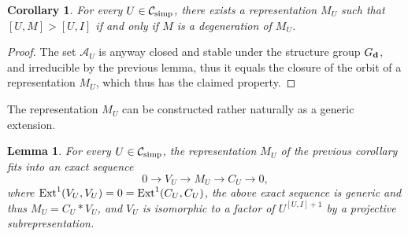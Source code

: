 \documentclass{amsart}
\numberwithin{equation}{section}
\newtheorem{lem}[thm]{Lemma}
\newtheorem{cor}[thm]{Corollary}
\theoremstyle{remark}
\begin{document}
\begin{cor}\label{cormu} For every $U\in\mathcal{C}_{\rm simp}$, there exists a representation $M_U$ such that $[U,M]>[U,I]$ if and only if $M$ is a degeneration of $M_U$. 
\end{cor}

\begin{proof} The set $\mathcal{A}_U$ is anyway closed and stable under the structure group $G_{\bf d}$, 
and irreducible by the previous lemma, thus it equals the closure of the orbit of a representation $M_U$, 
which thus has the claimed property.
\end{proof}

The representation $M_U$ can be constructed rather naturally as a generic extension.

\begin{lem}\label{lemconstructionmu} For every $U\in\mathcal{C}_{\rm simp}$, the representation $M_U$ of the previous corollary fits into an exact sequence
$$0\rightarrow V_U\rightarrow M_U\rightarrow C_U\rightarrow 0,$$
where ${\rm Ext}^1(V_U,V_U)=0={\rm Ext}^1(C_U,C_U)$, the above exact sequence is generic and thus $M_U=C_U*V_U$, and $V_U$ is isomorphic to a factor of $U^{[U,I]+1}$ by a projective subrepresentation.\end{lem}
\end{document}
